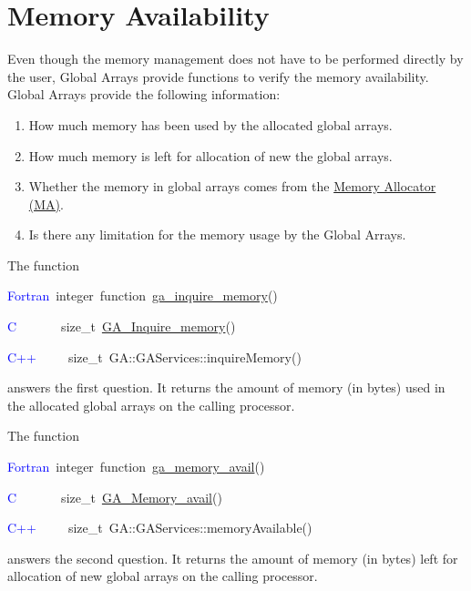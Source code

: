\section{Memory Availability }

Even though the memory management does not have to be performed directly
by the user, Global Arrays provide functions to verify the memory
availability. Global Arrays provide the following information:
\begin{enumerate}
\item How much memory has been used by the allocated global arrays. 
\item How much memory is left for allocation of new the global arrays. 
\item Whether the memory in global arrays comes from the \href{http://www.emsl.pnl.gov/docs/parsoft/ma/MAapi.html}{Memory Allocator (MA)}. 
\item Is there any limitation for the memory usage by the Global Arrays.
\end{enumerate}
The function
\begin{lyxcode}
\textcolor{blue}{Fortran~}integer~function~\href{http://www.emsl.pnl.gov/docs/global/ga_ops.html\#ga_inquire_memory}{ga\_{}inquire\_{}memory}()~

\textcolor{blue}{C}~~~~~~~size\_t~\href{http://www.emsl.pnl.gov/docs/global/c_nga_ops.html\#ga_inquire_memory}{GA\_{}Inquire\_{}memory}()~

\textcolor{blue}{C++~}~~~~size\_t~GA::GAServices::inquireMemory()
\end{lyxcode}
answers the first question. It returns the amount of memory (in bytes)
used in the allocated global arrays on the calling processor.

The function
\begin{lyxcode}
\textcolor{blue}{Fortran}~integer~function~\href{http://www.emsl.pnl.gov/docs/global/ga_ops.html\#ga_memory_avail}{ga\_{}memory\_{}avail}()~

\textcolor{blue}{C}~~~~~~~size\_t~\href{http://www.emsl.pnl.gov/docs/global/c_nga_ops.html\#ga_memory_avail}{GA\_{}Memory\_{}avail}()~

\textcolor{blue}{C++}~~~~~size\_t~GA::GAServices::memoryAvailable()
\end{lyxcode}
answers the second question. It returns the amount of memory (in bytes)
left for allocation of new global arrays on the calling processor.

